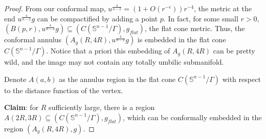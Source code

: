 \documentclass[12pt]{amsart}
\theoremstyle{definition}
\begin{document}
\begin{proof}
    From our conformal map, $u^{\frac{4}{n-2}} = (1+O(r^{-\epsilon}))r^{-4}$, the metric at the end $u^{\frac{4}{n-2}}g$ can be compactified by adding a point $p$. In fact, for some small $r>0$, $(B(p,r), u^{\frac{4}{n-2}} g)\subseteq (C(\mathbb{S}^{n-1}/\Gamma), g_{flat})$, the flat cone metric. Thus, the conformal annulus $(A_g(R,4R), u^{\frac{4}{n-2}}g)$ is embedded in the flat cone $C(\mathbb{S}^{n-1}/\Gamma)$.
     Notice that  a priori this embedding of $A_g(R,4R)$ can be pretty wild, and the image may not contain any totally umbilic submanifold.
     
     Denote $A(a,b)$ as the annulus region in the flat cone $C(\mathbb{S}^{n-1}/\Gamma)$ with respect to the distance function of the vertex.

    \textbf{Claim}: for $R$ sufficiently large, there is a region $A(2R,3R)\subseteq(C(\mathbb{S}^{n-1}/\Gamma), g_{flat})$, which can be conformally embedded in the region $(A_g(R,4R), g)$.

    






\end{proof}
\end{document}
